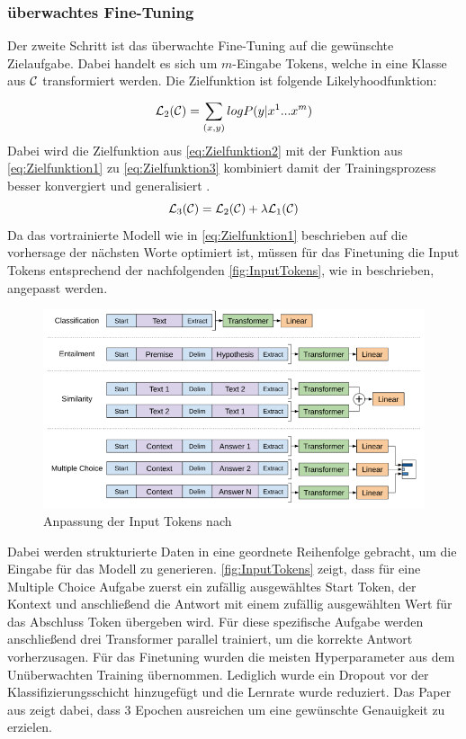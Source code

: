 \documentclass[conference]{IEEEtran}
\begin{document}
\subsubsection{überwachtes Fine-Tuning}
Der zweite Schritt ist das überwachte Fine-Tuning auf die gewünschte Zielaufgabe. Dabei handelt es sich um $m$-Eingabe Tokens, welche in eine Klasse aus $\cal C$ transformiert werden. Die Zielfunktion ist folgende Likelyhoodfunktion:
\begin{equation}
    {\cal L}_2({\cal C}) = \sum_{(x,y)}^{} log P(y|x^1 ... x^m)
    \label{eq:Zielfunktion2}
\end{equation}
Dabei wird die Zielfunktion aus \autoref{eq:Zielfunktion2} mit der Funktion aus \autoref{eq:Zielfunktion1} zu \autoref{eq:Zielfunktion3} kombiniert damit der Trainingsprozess besser konvergiert und generalisiert \cite{radfordImprovingLanguageUnderstanding}.
\begin{equation}
    {\cal L}_3({\cal C}) = {\cal L}_2({\cal C}) + \lambda {\cal L}_1({\cal C})
    \label{eq:Zielfunktion3}
\end{equation}
Da das vortrainierte Modell wie in \autoref{eq:Zielfunktion1} beschrieben auf die vorhersage der nächsten Worte optimiert ist, müssen für das Finetuning die Input Tokens entsprechend der nachfolgenden \autoref{fig:InputTokens}, wie in \cite{radfordImprovingLanguageUnderstanding} beschrieben, angepasst werden.
\begin{figure}[htbp]
    \centerline{\includegraphics[width=\linewidth]{Bilder/TokenAnpassungGPT1.png}}
    \caption{Anpassung der Input Tokens nach \cite{radfordImprovingLanguageUnderstanding}}
\label{fig:InputTokens}
\end{figure}
Dabei werden strukturierte Daten in eine geordnete Reihenfolge gebracht, um die Eingabe für das Modell zu generieren. \autoref{fig:InputTokens} zeigt, dass für eine Multiple Choice Aufgabe zuerst ein zufällig ausgewähltes Start Token, der Kontext und anschließend die Antwort mit einem zufällig ausgewählten Wert für das Abschluss Token übergeben wird. Für diese spezifische Aufgabe werden anschließend drei Transformer parallel trainiert, um die korrekte Antwort vorherzusagen. Für das Finetuning wurden die meisten Hyperparameter aus dem Unüberwachten Training übernommen. Lediglich wurde ein Dropout vor der Klassifizierungsschicht hinzugefügt und die Lernrate wurde reduziert. Das Paper aus \cite{radfordImprovingLanguageUnderstanding} zeigt dabei, dass 3 Epochen ausreichen um eine gewünschte Genauigkeit zu erzielen.
\end{document}

